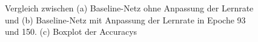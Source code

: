 \begin{figure}
     \centering
     \caption{Vergleich zwischen (a) Baseline-Netz ohne Anpassung der Lernrate und (b) Baseline-Netz mit Anpassung der Lernrate in Epoche 93 und 150. (c) Boxplot der Accuracys}
     \label{abb:BaseAcc}
\end{figure}

